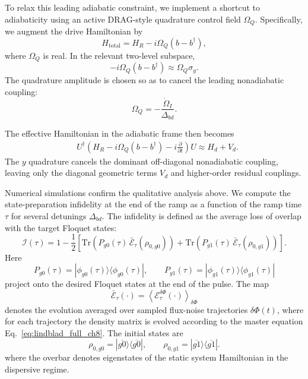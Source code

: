 \begin{appendices}
To relax this leading adiabatic constraint, we implement a shortcut to adiabaticity using an active DRAG-style quadrature control field $\Omega_Q$. Specifically, we augment the drive Hamiltonian by
\begin{equation}
H_{\text{total}}
=
H_R
-
i\Omega_Q (b-b^\dagger),
\end{equation}
where $\Omega_Q$ is real. In the relevant two-level subspace,
\begin{equation}
-i\Omega_Q (b-b^\dagger)
\approx
\Omega_Q \sigma_y .
\end{equation}
The quadrature amplitude is chosen so as to cancel the leading nonadiabatic coupling:
\begin{equation}
\Omega_Q
=
-\frac{\dot{\Omega}_I}{\Delta_{bd}} .
\end{equation}

The effective Hamiltonian in the adiabatic frame then becomes
\begin{equation}
\begin{aligned}
&U^\dagger
\left(
H_R
-
i\Omega_Q (b-b^\dagger)
-
i\frac{\partial}{\partial t}
\right)
U\approx
H_d
+
V_d.
\end{aligned}
\end{equation}
The $y$ quadrature cancels the dominant off-diagonal nonadiabatic coupling, leaving only the diagonal geometric terms $V_d$ and higher-order residual couplings.

Numerical simulations confirm the qualitative analysis above. We compute the state-preparation infidelity at the end of the ramp as a function of the ramp time $\tau$ for several detunings $\Delta_{bd}$. The infidelity is defined as the average loss of overlap with the target Floquet states:
\begin{equation}
\label{eq:infidelity_def}
\mathcal{I}(\tau)
=
1-\frac{1}{2}\left[
\mathrm{Tr}\!\left(P_{g0}(\tau)\,\bar{\mathcal{E}}_{\tau}\!\left(\rho_{0,g0}\right)\right)
+
\mathrm{Tr}\!\left(P_{g1}(\tau)\,\bar{\mathcal{E}}_{\tau}\!\left(\rho_{0,g1}\right)\right)
\right].
\end{equation}
Here
\begin{equation}
P_{g0}(\tau)
=
|\phi_{g0}(\tau)\rangle\langle\phi_{g0}(\tau)|,
\qquad
P_{g1}(\tau)
=
|\phi_{g1}(\tau)\rangle\langle\phi_{g1}(\tau)|
\end{equation}
project onto the desired Floquet states at the end of the pulse. The map
\begin{equation}
\bar{\mathcal{E}}_{\tau}(\cdot)
=
\left\langle
\mathcal{E}_{\tau}^{\delta\Phi}(\cdot)
\right\rangle_{\delta\Phi}
\end{equation}
denotes the evolution averaged over sampled flux-noise trajectories $\delta\Phi(t)$, where for each trajectory the density matrix is evolved according to the master equation Eq.~\eqref{eq:lindblad_full_ch8}. The initial states are
\begin{equation}
\rho_{0,g0}
=
|\overline{g0}\rangle\langle\overline{g0}|,
\qquad
\rho_{0,g1}
=
|\overline{g1}\rangle\langle\overline{g1}|.
\end{equation}
where the overbar denotes eigenstates of the static system Hamiltonian in the dispersive regime.


\end{appendices}
